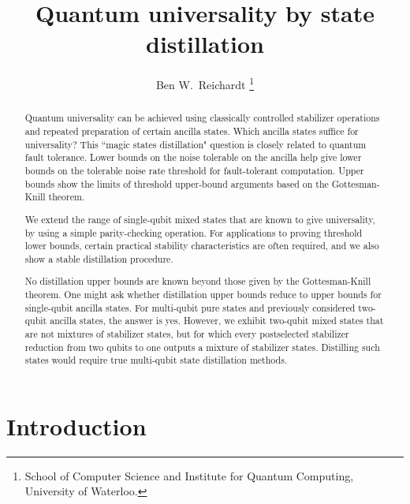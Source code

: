 \documentclass[11pt]{article}
\theoremstyle{note}
\begin{document}
\author{%
Ben W.~Reichardt%
  \thanks{School of Computer Science and Institute for Quantum Computing, University of Waterloo.}}
\date{}

\def\magic #1{\mathcal{U}(#1)}

\title{Quantum universality by state distillation}

\date{}

\maketitle

\begin{abstract}
Quantum universality can be achieved using classically controlled stabilizer operations and repeated preparation of certain ancilla states.  Which ancilla states suffice for universality?  This ``magic states distillation" question is closely related to quantum fault tolerance.  Lower bounds on the noise tolerable on the ancilla help give lower bounds on the tolerable noise rate threshold for fault-tolerant computation.  Upper bounds show the limits of threshold upper-bound arguments based on the Gottesman-Knill theorem.  

We extend the range of single-qubit mixed states that are known to give universality, by using a simple parity-checking operation.  For applications to proving threshold lower bounds, certain practical stability characteristics are often required, and we also show a stable distillation procedure.  

No distillation upper bounds are known beyond those given by the Gottesman-Knill theorem.  One might ask whether distillation upper bounds reduce to upper bounds for single-qubit ancilla states.  For multi-qubit pure states and previously considered two-qubit ancilla states, the answer is yes.  However, we exhibit two-qubit mixed states that are not mixtures of stabilizer states, but for which every postselected stabilizer reduction from two qubits to one outputs a mixture of stabilizer states.  Distilling such states would require true multi-qubit state distillation methods.
\end{abstract}


\section{Introduction} \label{s:introduction}
\end{document}
